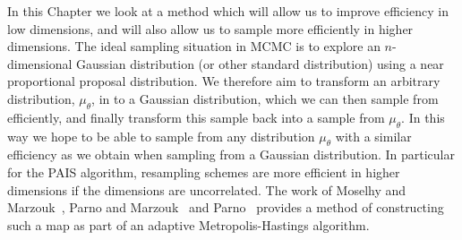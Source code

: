\documentclass[final]{siamltex}
\begin{document}
In this Chapter we look at a method which will allow us to improve efficiency in low dimensions, and
will also allow us to sample more efficiently in higher dimensions. The ideal sampling
situation in MCMC is to explore an $n$-dimensional Gaussian distribution (or other standard distribution) using a near proportional
proposal distribution. We therefore aim to transform an arbitrary distribution, $\mu_\theta$, in to a Gaussian distribution, which we can then sample from efficiently, and finally transform this sample back into a sample from $\mu_\theta$. In this way we hope to be able to sample from any distribution $\mu_\theta$ with a similar efficiency as we obtain when sampling from a Gaussian distribution. In particular for the PAIS algorithm, resampling schemes are more efficient in higher
dimensions if the dimensions are uncorrelated. The work of Moselhy and
Marzouk~\cite{el2012bayesian}, Parno and Marzouk~\cite{parno2014transport} and
Parno~\cite{parno2015transport} provides a method of constructing such a map as part of an adaptive
Metropolis-Hastings algorithm.

%
\end{document}
